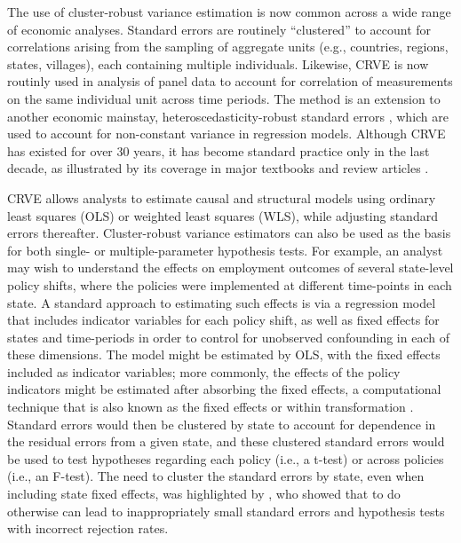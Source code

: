 \documentclass[12pt]{article}\usepackage[]{graphicx}\usepackage[]{color}
\begin{document}
The use of cluster-robust variance estimation \citep[CRVE][]{Arellano1987computing, Liang1986longitudinal, white1984asymptotic} is now common across a wide range of economic analyses.
Standard errors are routinely ``clustered'' to account for correlations arising from the sampling of aggregate units (e.g., countries, regions, states, villages), each containing multiple individuals. 
Likewise, CRVE is now routinly used in analysis of panel data to account for correlation of measurements on the same individual unit across time periods. 
The method is an extension to another economic mainstay, heteroscedasticity-robust standard errors \citep{eicker1967limit, Huber1967behavior, White1980heteroskedasticity}, which are used to account for non-constant variance in regression models. 
Although CRVE has existed for over 30 years, it has become standard practice only in the last decade, as illustrated by its coverage in major textbooks and review articles \citep[e.g.,][]{Wooldridge2010econometric, Angrist2009mostly, Cameron2015practitioners}.

CRVE allows analysts to estimate causal and structural models using ordinary least squares (OLS) or weighted least squares (WLS), while adjusting standard errors thereafter.
Cluster-robust variance estimators can also be used as the basis for both single- or multiple-parameter hypothesis tests.
For example, an analyst may wish to understand the effects on employment outcomes of several state-level policy shifts, where the policies were implemented at different time-points in each state. 
A standard approach to estimating such effects is via a regression model that includes indicator variables for each policy shift, as well as fixed effects for states and time-periods in order to control for unobserved confounding in each of these dimensions. 
The model might be estimated by OLS, with the fixed effects included as indicator variables; more commonly, the effects of the policy indicators might be estimated after absorbing the fixed effects, a computational technique that is also known as the fixed effects or within transformation \citep{Wooldridge2010econometric}. 
Standard errors would then be clustered by state to account for dependence in the residual errors from a given state, and these clustered standard errors would be used to test hypotheses regarding each policy (i.e., a t-test) or across policies (i.e., an F-test).
The need to cluster the standard errors by state, even when including state fixed effects, was highlighted by \citet{Bertrand2004how}, who showed that to do otherwise can lead to inappropriately small standard errors and hypothesis tests with incorrect rejection rates. 
\end{document}
